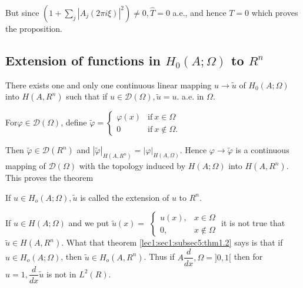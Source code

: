 But since $(1 + \sum_j | A_j (2 \pi i \xi)|^2) \neq 0, \hat{T} = 0$
a.e., and hence $T=0$ which proves the proposition. 

\subsection{Extension of functions in \texorpdfstring{$H_0(A; \Omega)$}{H0(A;Omega)} to \texorpdfstring{$R^n$}{Rn}}\label{lec1:sec1:subsec5} 

\begin{theorem}\label{lec1:sec1:subsec5:thm1.2}%
  There exists one and only one continuous linear mapping $u \to
  \tilde{u}$ of $H_0(A; \Omega)$ into $H(A ,R^n)$ such that if $u
  \in \mathscr{D} (\Omega), \tilde{u}=u$. a.e. in $\Omega$. 
\end{theorem}

For\pageoriginale $\varphi \in \mathscr{D}(\Omega)$, define
$\tilde{\varphi}= \begin{cases} \varphi(x)  & \text{if}~ x \in
  \Omega \\  0 & \text{if}~ x \not\in \Omega.\end{cases}$ 


Then $\tilde{\varphi} \in \mathscr{D}(R^n)$ and $|\tilde{
  \varphi}|_{H(A ,R^n)}= |\varphi|_{H(A, \Omega)}$. Hence $\varphi \to
\tilde{\varphi}$ is a continuous mapping of $\mathscr{D} (\Omega)$
with the topology induced by $H(A; \Omega)$ into $H(A,R^n)$. This
proves the theorem 
\begin{definition}\label{lec1:sec1:subsec5:def1.3}%
  If $u \in H_o(A; \Omega), \tilde{u}$ is called the extension of $u$ to $R^n$.
\end{definition}

\begin{remark*}
  If $u \in H (A; \Omega)$ and we put $\tilde{u}(x)=$
  $
  \begin{cases}
    u(x), & x \in \Omega \\ 0, & x \notin \Omega
  \end{cases}$
  it is not true that $\tilde{u}\in H(A,R^n)$. What that theorem
\ref{lec1:sec1:subsec5:thm1.2} says is that if $u \in H_o(A; \Omega)$, then $\tilde{u}
\in H_o (A,R^n)$. Thus if $A \dfrac{d}{dx}, \Omega =]0, 1[$
       then for $u=1, \dfrac{d}{dx} \tilde{u}$ is not in $L^2(R)$. 
\end{remark*}
